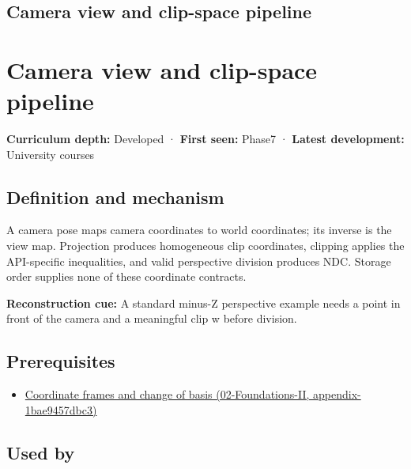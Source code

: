 \hypertarget{appendix-1c07d64f5e70}{}
\section*{Camera view and clip-space pipeline}
\chapter{Camera view and clip-space pipeline}\label{appendix-1c07d64f5e70-camera-view-and-clip-space-pipeline}

\textbf{Curriculum depth:} Developed · \textbf{First seen:} Phase7 · \textbf{Latest development:} University courses

\section{Definition and mechanism}\label{appendix-1c07d64f5e70-definition-and-mechanism}

A camera pose maps camera coordinates to world coordinates; its inverse is the view map. Projection produces homogeneous clip coordinates, clipping applies the API-specific inequalities, and valid perspective division produces NDC. Storage order supplies none of these coordinate contracts.

\textbf{Reconstruction cue:} A standard minus-Z perspective example needs a point in front of the camera and a meaningful clip w before division.

\section{Prerequisites}\label{appendix-1c07d64f5e70-prerequisites}

\begin{itemize}
\tightlist
\item
  \href{../02-Foundations-II/main.pdf\#nameddest=appendix-1bae9457dbc3}{Coordinate frames and change of basis (02-Foundations-II, appendix-1bae9457dbc3)}
\end{itemize}

\section{Used by}\label{appendix-1c07d64f5e70-used-by}

